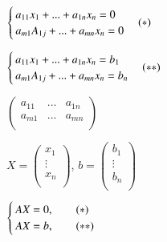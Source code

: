 \documentclass[printbox]{BHCexam}
\begin{document}
$\begin{cases}{}
  a_{11}x_1+...+a_{1n}x_{n}=0\\
  a_{m1}A_{1j}+...+a_{mn}x_{n}=0
   \end{cases}(*)\\$

$\begin{cases}{}
  a_{11}x_1+...+a_{1n}x_{n}=b_1\\
  a_{m1}A_{1j}+...+a_{mn}x_{n}=b_n
   \end{cases}(**)\\$

   $\left(                 %
   \begin{array}{ccc}   %
     a_{11} & ... & a_{1n}\\  %
     a_{m1} & ... & a_{mn}\\ 
   \end{array}
 \right)$                 %

 $X=\left(                 %
 \begin{array}{c}   %
   x_{1} \\  %
   \vdots\\     
   x_{n} \\ 
 \end{array}
\right)$,                 %
$b=\left(                 %
\begin{array}{c}   %
  b_{1} \\  %
  \vdots\\     
  b_{n} \\ 
\end{array}
\right)$                 %

$\begin{cases}{}
  AX=0,\qquad (*) \\
  AX=b,\qquad (**)
   \end{cases}\\$
\end{document}
